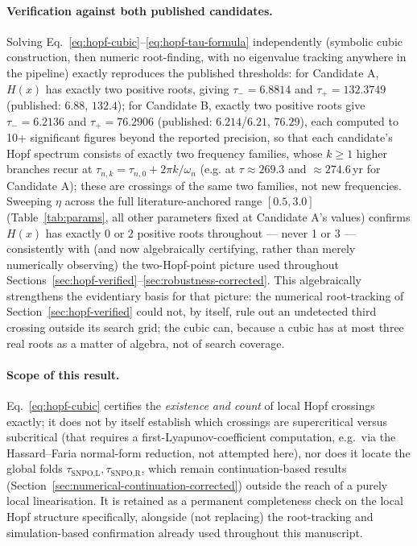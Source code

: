 \documentclass[twocolumn,10pt]{article}
\begin{document}
\paragraph{Verification against both published candidates.} Solving Eq.~\eqref{eq:hopf-cubic}--\eqref{eq:hopf-tau-formula} independently (symbolic cubic construction, then numeric root-finding, with no eigenvalue tracking anywhere in the pipeline) exactly reproduces the published thresholds: for Candidate A, $H(x)$ has exactly two positive roots, giving $\tau_-=6.8814$ and $\tau_+=132.3749$ (published: $6.88$, $132.4$); for Candidate B, exactly two positive roots give $\tau_-=6.2136$ and $\tau_+=76.2906$ (published: $6.214$/$6.21$, $76.29$), each computed to 10+ significant figures beyond the reported precision, so that each candidate's Hopf spectrum consists of exactly two frequency families, whose $k\ge1$ higher branches recur at $\tau_{n,k}=\tau_{n,0}+2\pi k/\omega_n$ (e.g. at $\tau\approx269.3$ and $\approx274.6$\,yr for Candidate A); these are crossings of the same two families, not new frequencies. Sweeping $\eta$ across the full literature-anchored range $[0.5,3.0]$ (Table~\ref{tab:params}, all other parameters fixed at Candidate A's values) confirms $H(x)$ has exactly 0 or 2 positive roots throughout — never 1 or 3 — consistently with (and now algebraically certifying, rather than merely numerically observing) the two-Hopf-point picture used throughout Sections~\ref{sec:hopf-verified}--\ref{sec:robustness-corrected}. This algebraically strengthens the evidentiary basis for that picture: the numerical root-tracking of Section~\ref{sec:hopf-verified} could not, by itself, rule out an undetected third crossing outside its search grid; the cubic can, because a cubic has at most three real roots as a matter of algebra, not of search coverage.

\paragraph{Scope of this result.} Eq.~\eqref{eq:hopf-cubic} certifies the \emph{existence and count} of local Hopf crossings exactly; it does not by itself establish which crossings are supercritical versus subcritical (that requires a first-Lyapunov-coefficient computation, e.g.\ via the Hassard--Faria normal-form reduction, not attempted here), nor does it locate the global folds $\tau_{\text{SNPO,L}},\tau_{\text{SNPO,R}}$, which remain continuation-based results (Section~\ref{sec:numerical-continuation-corrected}) outside the reach of a purely local linearisation. It is retained as a permanent completeness check on the local Hopf structure specifically, alongside (not replacing) the root-tracking and simulation-based confirmation already used throughout this manuscript.
\end{document}
